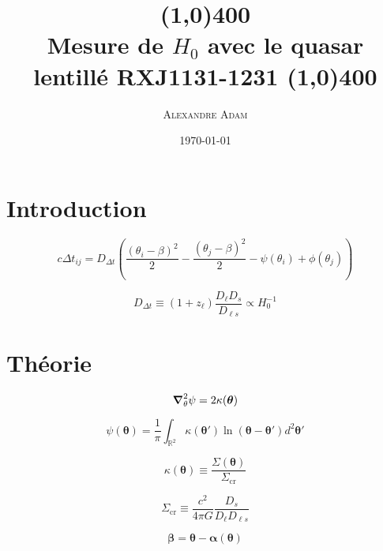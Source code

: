 \documentclass[times,10pt,twocolumn]{article}
\title{\vspace{-10mm}
\line(1,0){400}\\
Mesure de $H_0$ avec le quasar lentillé \textsc{RXJ1131-1231}
\line(1,0){400}
\vspace{-4mm}
}
\author{\large \textsc{Alexandre Adam}}
\affiliation{\vspace{2mm} PHY6669 -- Cosmologie\\
Département de physique \\ Université de Montréal
}
\date{\today}
\begin{document}
\twocolumn[
\maketitle
\begin{onecolabstract} %
\vspace{4mm} %
\end{onecolabstract}
]

\section{Introduction}\label{sec:intro}
\begin{equation}\label{eq:TimeDelay} 
        c\Delta t_{ij} = D_{\Delta t} \left( \frac{(\theta_i - \beta)^2}{2} - \frac{(\theta_j - \beta)^{2}}{2}
        - \psi(\theta_i) + \phi(\theta_j)\right)
\end{equation} 

\begin{equation}\label{eq:Ddt} 
        D_{\Delta t} \equiv (1 + z_{\ell}) \frac{D_\ell D_s}{D_{\ell s}} \propto H_0^{-1}
\end{equation} 
\section{Théorie}\label{sec:theorie}

\begin{equation}\label{eq:Poisson} 
        \grad^{2}_{\theta} \psi = 2 \kappa(\boldsymbol{\theta} )
\end{equation} 

\begin{equation}\label{eq:Potentiel} 
        \psi(\boldsymbol{ \theta}) = \frac{1}{\pi} \int_{\mathbb{R}^2} 
        \kappa(\boldsymbol{ \theta}') \ln(\boldsymbol{\theta} - \boldsymbol{\theta}') d^2\boldsymbol{\theta}'
\end{equation} 

\begin{equation}\label{eq:Convergence} 
        \kappa(\boldsymbol{\theta}) \equiv \frac{\Sigma(\boldsymbol{\theta})}{\Sigma_{\mathrm{cr}}}
\end{equation} 

\begin{equation}\label{eq:Sigcritique} 
        \Sigma_{\mathrm{cr}} \equiv \frac{c^2}{4\pi G} \frac{D_s}{D_\ell D_{\ell s}}
\end{equation} 

\begin{equation}\label{eq:LensEquation} 
        \boldsymbol{\beta} = \boldsymbol{\theta} - \boldsymbol{\alpha}(\boldsymbol{\theta})
\end{equation} 
\end{document}
